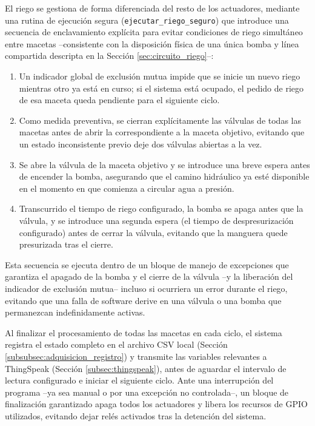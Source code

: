 El riego se gestiona de forma diferenciada del resto de los actuadores, mediante una rutina de ejecución segura (\texttt{ejecutar\_riego\_seguro}) que introduce una secuencia de enclavamiento explícita para evitar condiciones de riego simultáneo entre macetas --consistente con la disposición física de una única bomba y línea compartida descripta en la Sección \ref{sec:circuito_riego}--:

\begin{enumerate}
    \item Un indicador global de exclusión mutua impide que se inicie un nuevo riego mientras otro ya está en curso; si el sistema está ocupado, el pedido de riego de esa maceta queda pendiente para el siguiente ciclo.
    \item Como medida preventiva, se cierran explícitamente las válvulas de todas las macetas antes de abrir la correspondiente a la maceta objetivo, evitando que un estado inconsistente previo deje dos válvulas abiertas a la vez.
    \item Se abre la válvula de la maceta objetivo y se introduce una breve espera antes de encender la bomba, asegurando que el camino hidráulico ya esté disponible en el momento en que comienza a circular agua a presión.
    \item Transcurrido el tiempo de riego configurado, la bomba se apaga antes que la válvula, y se introduce una segunda espera (el tiempo de despresurización configurado) antes de cerrar la válvula, evitando que la manguera quede presurizada tras el cierre.
\end{enumerate}

Esta secuencia se ejecuta dentro de un bloque de manejo de excepciones que garantiza el apagado de la bomba y el cierre de la válvula --y la liberación del indicador de exclusión mutua-- incluso si ocurriera un error durante el riego, evitando que una falla de software derive en una válvula o una bomba que permanezcan indefinidamente activas.

Al finalizar el procesamiento de todas las macetas en cada ciclo, el sistema registra el estado completo en el archivo CSV local (Sección \ref{subsubsec:adquisicion_registro}) y transmite las variables relevantes a ThingSpeak (Sección \ref{subsec:thingspeak}), antes de aguardar el intervalo de lectura configurado e iniciar el siguiente ciclo. Ante una interrupción del programa --ya sea manual o por una excepción no controlada--, un bloque de finalización garantizado apaga todos los actuadores y libera los recursos de GPIO utilizados, evitando dejar relés activados tras la detención del sistema.


